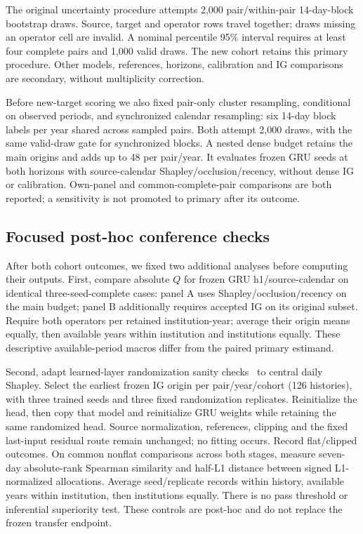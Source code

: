 \documentclass[conference]{IEEEtran}
\begin{document}
The original uncertainty procedure attempts 2,000 pair/within-pair 14-day-block bootstrap draws. Source, target and operator rows travel together; draws missing an operator cell are invalid. A nominal percentile 95\% interval requires at least four complete pairs and 1,000 valid draws. The new cohort retains this primary procedure. Other models, references, horizons, calibration and IG comparisons are secondary, without multiplicity correction.

Before new-target scoring we also fixed pair-only cluster resampling, conditional on observed periods, and synchronized calendar resampling: six 14-day block labels per year shared across sampled pairs. Both attempt 2,000 draws, with the same valid-draw gate for synchronized blocks. A nested dense budget retains the main origins and adds up to 48 per pair/year. It evaluates frozen GRU seeds at both horizons with source-calendar Shapley/occlusion/recency, without dense IG or calibration. Own-panel and common-complete-pair comparisons are both reported; a sensitivity is not promoted to primary after its outcome.


\subsection{Focused post-hoc conference checks}
After both cohort outcomes, we fixed two additional analyses before computing their outputs. First, compare absolute $Q$ for frozen GRU h1/source-calendar on identical three-seed-complete cases: panel A uses Shapley/occlusion/recency on the main budget; panel B additionally requires accepted IG on its original subset. Require both operators per retained institution-year; average their origin means equally, then available years within institution and institutions equally. These descriptive available-period macros differ from the paired primary estimand.

Second, adapt learned-layer randomization sanity checks~\cite{sanity} to central daily Shapley. Select the earliest frozen IG origin per pair/year/cohort (126 histories), with three trained seeds and three fixed randomization replicates. Reinitialize the head, then copy that model and reinitialize GRU weights while retaining the same randomized head. Source normalization, references, clipping and the fixed last-input residual route remain unchanged; no fitting occurs. Record flat/clipped outcomes. On common nonflat comparisons across both stages, measure seven-day absolute-rank Spearman similarity and half-L1 distance between signed L1-normalized allocations. Average seed/replicate records within history, available years within institution, then institutions equally. There is no pass threshold or inferential superiority test. These controls are post-hoc and do not replace the frozen transfer endpoint.
\end{document}
